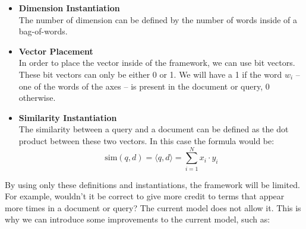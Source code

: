 \documentclass{article}
\begin{document}
\begin{itemize}
	\item \textbf{Dimension Instantiation}
	\vspace{.2cm} \\
	The number of dimension can be defined by the number of words inside of a bag-of-words.
	
	\item \textbf{Vector Placement}
	\vspace{.2cm} \\
	In order to place the vector inside of the framework, we can use bit vectors. These bit vectors can only be either 0 or 1. We will have a 1 if the word $w_i$ -- one of the words of the axes -- is present in the document or query, 0 otherwise.
	
	\item \textbf{Similarity Instantiation}
	\vspace{.2cm} \\
	The similarity between a query and a document can be defined as the dot product between these two vectors. In this case the formula would be:
	\[ \text{sim}(q, d) = \langle q, d \rangle = \sum^N_{i = 1} x_i \cdot y_i \]
\end{itemize}
By using only these definitions and instantiations, the framework will be limited. For example, wouldn't it be correct to give more credit to terms that appear more times in a document or query? The current model does not allow it. This is why we can introduce some improvements to the current model, such as:
\end{document}

